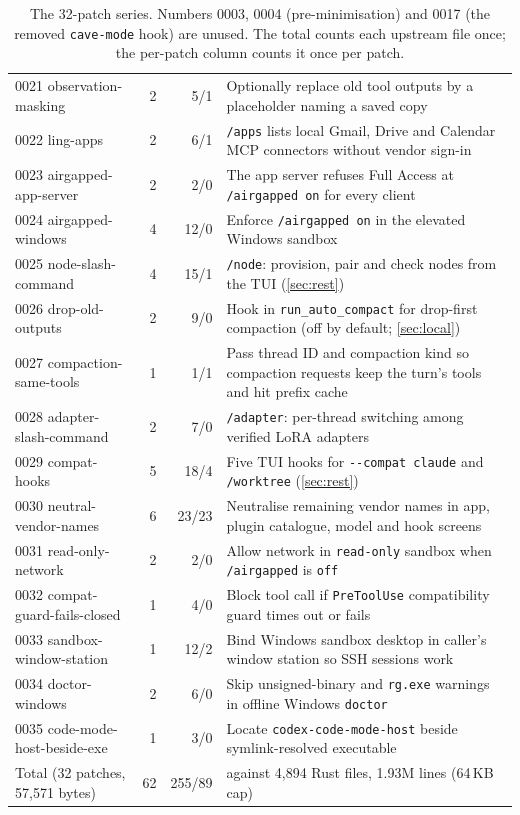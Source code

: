 \documentclass[11pt]{article}
\newcommand{\code}[1]{\texttt{#1}}
\begin{document}
\begin{table}[tbp]
\begin{tabularx}{\linewidth}{@{}l r r X@{}}
0021 observation-masking & 2 & 5/1 & Optionally replace old tool outputs by a placeholder naming a saved copy \\
0022 ling-apps & 2 & 6/1 & \code{/apps} lists local Gmail, Drive and Calendar MCP connectors without vendor sign-in \\
0023 airgapped-app-server & 2 & 2/0 & The app server refuses Full Access at \code{/airgapped on} for every client \\
0024 airgapped-windows & 4 & 12/0 & Enforce \code{/airgapped on} in the elevated Windows sandbox \\
0025 node-slash-command & 4 & 15/1 & \code{/node}: provision, pair and check nodes from the TUI (\cref{sec:rest}) \\
0026 drop-old-outputs & 2 & 9/0 & Hook in \code{run\_auto\_compact} for drop-first compaction (off by default; \cref{sec:local}) \\
0027 compaction-same-tools & 1 & 1/1 & Pass thread ID and compaction kind so compaction requests keep the turn's tools and hit prefix cache \\
0028 adapter-slash-command & 2 & 7/0 & \code{/adapter}: per-thread switching among verified LoRA adapters \\
0029 compat-hooks & 5 & 18/4 & Five TUI hooks for \code{-{}-compat claude} and \code{/worktree} (\cref{sec:rest}) \\
0030 neutral-vendor-names & 6 & 23/23 & Neutralise remaining vendor names in app, plugin catalogue, model and hook screens \\
0031 read-only-network & 2 & 2/0 & Allow network in \code{read-only} sandbox when \code{/airgapped} is \code{off} \\
0032 compat-guard-fails-closed & 1 & 4/0 & Block tool call if \code{PreToolUse} compatibility guard times out or fails \\
0033 sandbox-window-station & 1 & 12/2 & Bind Windows sandbox desktop in caller's window station so SSH sessions work \\
0034 doctor-windows & 2 & 6/0 & Skip unsigned-binary and \code{rg.exe} warnings in offline Windows \code{doctor} \\
0035 code-mode-host-beside-exe & 1 & 3/0 & Locate \code{codex-code-mode-host} beside symlink-resolved executable \\
\midrule
Total (32 patches, 57{,}571 bytes) & 62 & 255/89 & against 4{,}894 Rust files, 1.93M lines (64\,KB cap) \\
\bottomrule
\end{tabularx}
\caption{The 32-patch series. Numbers 0003, 0004 (pre-minimisation) and 0017 (the removed
\code{cave-mode} hook) are unused. The total counts each upstream file once; the per-patch column
counts it once per patch.}
\label{tab:patches}
\end{table}
\end{document}
